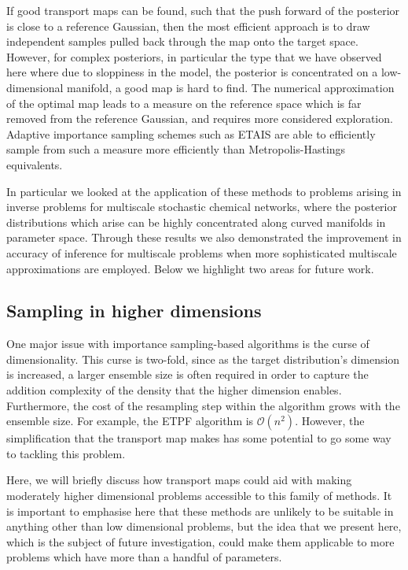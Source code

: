 \documentclass[final]{siamltex}
\newcommand{\edit}[1]{{\color{red} #1}}
\begin{document}
\edit{If good transport maps can be found, such that the push forward
  of the posterior is close to a reference Gaussian, then the most
  efficient approach is to draw independent samples pulled back
  through the map onto the target space. However, for complex
  posteriors, in particular the type that we have observed here where
  due to sloppiness in the model, the posterior is concentrated on a
  low-dimensional manifold, a good map is hard to find. The numerical
  approximation of the optimal map leads to a measure on the reference
  space which is far removed from the reference Gaussian, and requires
  more considered exploration. Adaptive importance sampling schemes
  such as ETAIS are able to efficiently sample from such a measure
  more efficiently than Metropolis-Hastings equivalents.}

In particular we looked at the application of these methods to
problems arising in inverse problems for multiscale stochastic
chemical networks, where the posterior distributions which arise can
be highly concentrated along curved manifolds in parameter
space. Through these results we also demonstrated the improvement in
accuracy of inference for multiscale problems when more sophisticated
multiscale approximations are employed. Below we highlight two areas for future work.

\subsection{Sampling in higher
  dimensions}\label{sec:TETAIS_higher_dim}

One major issue with importance sampling-based algorithms is the curse of
dimensionality. This curse is two-fold, since as the target
distribution's dimension is increased, a larger ensemble size is often
required in order to capture the addition complexity of the density
that the higher dimension enables. Furthermore, the cost of the
resampling step within the algorithm grows with the ensemble size. For
example, the ETPF algorithm is $\mathcal{O}(n^2)$. However, the
simplification that the transport map makes has some potential to go
some way to tackling this problem.

Here, we will briefly discuss how transport maps could aid
with making moderately higher dimensional problems accessible to this
family of methods. It is important to emphasise here that these
methods are unlikely to be suitable in anything other than low
dimensional problems, but the idea that we present here, which is the
subject of future investigation, could make them applicable to more
problems which have more than a handful of parameters.
\end{document}
